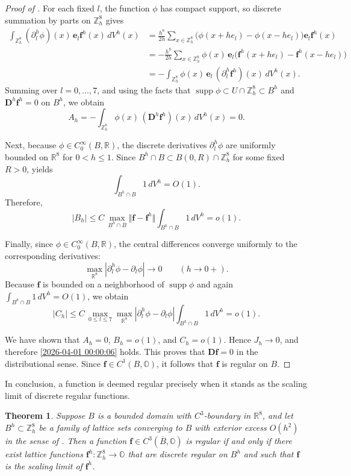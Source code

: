 \documentclass{amsart}
\newtheorem{theorem}{Theorem}[section]
\theoremstyle{definition}
\theoremstyle{remark}
\numberwithin{equation}{section}
\newcommand{\R}{\mathbb{R}}
\newcommand{\p}{\partial}
\newcommand{\OO}{\mathbb O}
\newcommand{\Z}{\mathbb Z}
\newcommand{\f}{\bm{f}}
\newcommand{\e}{\bm{e}}
\begin{document}
\begin{proof}[Proof of ]
    For each fixed $l$, the function $\phi$ has compact support, so discrete summation by parts on $\Z_h^8$ gives
    \[
    \begin{aligned}
        \int_{\Z_h^8} (\p_l^h\phi)(x)\,\e_l\f^h(x)\,dV^h(x)
        &= \frac{h^8}{2h}\sum_{x\in \Z_h^8} \bigl(\phi(x+he_l)-\phi(x-he_l)\bigr)\e_l\f^h(x)\\
        &= -\frac{h^8}{2h}\sum_{x\in \Z_h^8} \phi(x)\,\e_l\bigl(\f^h(x+he_l)-\f^h(x-he_l)\bigr)\\
        &= -\int_{\Z_h^8} \phi(x)\,\e_l\,(\p_l^h\f^h)(x)\,dV^h(x).
    \end{aligned}
    \]
    Summing over $l=0,\dots,7$, and using the facts that $\operatorname{supp}\phi\subset U\cap \Z_h^8\subset B^h$ and $\bm D^h\f^h=0$ on $B^h$, we obtain
    \[
    A_h=-\int_{\Z_h^8}\phi(x)\,(\bm D^h\f^h)(x)\,dV^h(x)=0.
    \]

    Next, because $\phi\in C_0^\infty(B,\R)$, the discrete derivatives $\p_l^h\phi$ are uniformly bounded on $\R^8$ for $0<h\le 1$. Since $B^h\cap B\subset B(0,R)\cap \Z_h^8$ for some fixed $R>0$,  yields
    \[
    \int_{B^h\cap B}1\,dV^h=O(1).
    \]
    Therefore,
    \[
    |B_h|\le C\,\max_{B^h\cap B}\Vert \f-\f^h\Vert\int_{B^h\cap B}1\,dV^h=o(1).
    \]

    Finally, since $\phi\in C_0^\infty(B,\R)$, the central differences converge uniformly to the corresponding derivatives:
    \[
    \max_{\R^8}|\p_l^h\phi-\p_l\phi|\to 0 \qquad (h\to 0+).
    \]
    Because $\f$ is bounded on a neighborhood of $\operatorname{supp}\phi$ and again $\int_{B^h\cap B}1\,dV^h=O(1)$, we obtain
    \[
    |C_h|\le C\,\max_{0\le l\le 7}\max_{\R^8}|\p_l^h\phi-\p_l\phi|\int_{B^h\cap B}1\,dV^h=o(1).
    \]

    We have shown that $A_h=0$, $B_h=o(1)$, and $C_h=o(1)$. Hence $J_h\to 0$, and therefore \eqref{2026-04-01 00:00:06} holds. This proves that $\bm D\f=0$ in the distributional sense. Since $\f\in C^1(B,\OO)$, it follows that $\f$ is regular on $B$.
\end{proof}








In conclusion, a function is deemed regular precisely when it stands as the scaling limit of discrete regular functions.


\begin{theorem}
	Suppose $B$ is a bounded domain with $C^3$-boundary in $\R^8$, and let $B^h\subset \Z_h^8$ be a family of lattice sets converging to $B$ with exterior excess $O(h^2)$ in the sense of . Then a function $\f \in C^3(\overline B,\OO)$ is regular if and only if there exist lattice functions $\f^h : \Z_h^8\longrightarrow \OO$ that are discrete regular on \(B^h\) and such that $\f$ is the scaling limit of $\f^h$.
\end{theorem}
\end{document}
